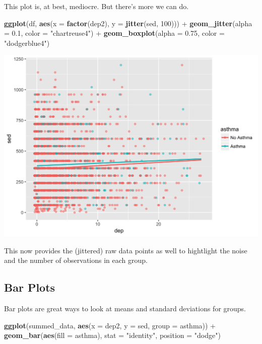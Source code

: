 \documentclass[]{tufte-book}
\newenvironment{Shaded}{}{}
\newcommand{\KeywordTok}[1]{\textcolor[rgb]{0.00,0.44,0.13}{\textbf{#1}}}
\newcommand{\DataTypeTok}[1]{\textcolor[rgb]{0.56,0.13,0.00}{#1}}
\newcommand{\DecValTok}[1]{\textcolor[rgb]{0.25,0.63,0.44}{#1}}
\newcommand{\FloatTok}[1]{\textcolor[rgb]{0.25,0.63,0.44}{#1}}
\newcommand{\StringTok}[1]{\textcolor[rgb]{0.25,0.44,0.63}{#1}}
\newcommand{\OperatorTok}[1]{\textcolor[rgb]{0.40,0.40,0.40}{#1}}
\newcommand{\NormalTok}[1]{#1}
\theoremstyle{definition}
\theoremstyle{definition}
\theoremstyle{remark}
\begin{document}
This plot is, at best, mediocre. But there's more we can do.

\begin{Shaded}
\begin{Highlighting}[]
\KeywordTok{ggplot}\NormalTok{(df, }\KeywordTok{aes}\NormalTok{(}\DataTypeTok{x =} \KeywordTok{factor}\NormalTok{(dep2), }\DataTypeTok{y =} \KeywordTok{jitter}\NormalTok{(sed, }
    \DecValTok{100}\NormalTok{))) }\OperatorTok{+}\StringTok{ }\KeywordTok{geom_jitter}\NormalTok{(}\DataTypeTok{alpha =} \FloatTok{0.1}\NormalTok{, }\DataTypeTok{color =} \StringTok{"chartreuse4"}\NormalTok{) }\OperatorTok{+}\StringTok{ }
\StringTok{    }\KeywordTok{geom_boxplot}\NormalTok{(}\DataTypeTok{alpha =} \FloatTok{0.75}\NormalTok{, }\DataTypeTok{color =} \StringTok{"dodgerblue4"}\NormalTok{)}
\end{Highlighting}
\end{Shaded}

\includegraphics{_main_files/figure-latex/unnamed-chunk-137-1}

This now provides the (jittered) raw data points as well to hightlight
the noise and the number of observations in each group.

\subsection*{Bar Plots}\label{bar-plots}

Bar plots are great ways to look at means and standard deviations for
groups.

\begin{Shaded}
\begin{Highlighting}[]
\KeywordTok{ggplot}\NormalTok{(summed_data, }\KeywordTok{aes}\NormalTok{(}\DataTypeTok{x =}\NormalTok{ dep2, }\DataTypeTok{y =}\NormalTok{ sed, }\DataTypeTok{group =}\NormalTok{ asthma)) }\OperatorTok{+}\StringTok{ }
\StringTok{    }\KeywordTok{geom_bar}\NormalTok{(}\KeywordTok{aes}\NormalTok{(}\DataTypeTok{fill =}\NormalTok{ asthma), }\DataTypeTok{stat =} \StringTok{"identity"}\NormalTok{, }
        \DataTypeTok{position =} \StringTok{"dodge"}\NormalTok{)}
\end{Highlighting}
\end{Shaded}
\end{document}
